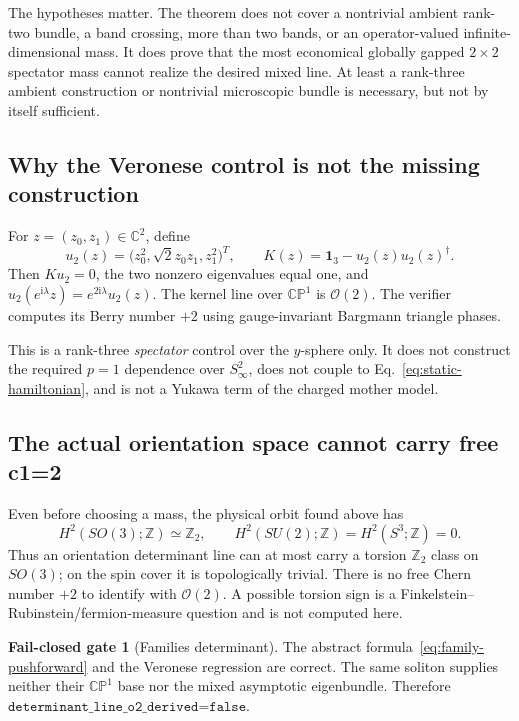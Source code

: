 \documentclass[11pt]{article}
\theoremstyle{definition}
\newtheorem{gate}[theorem]{Fail-closed gate}
\theoremstyle{remark}
\newcommand{\ii}{\mathrm i}
\newcommand{\CC}{\mathbb C}
\newcommand{\ZZ}{\mathbb Z}
\newcommand{\CP}{\mathbb {CP}}
\newcommand{\cO}{\mathcal O}
\begin{document}
The hypotheses matter.  The theorem does not cover a nontrivial ambient
rank-two bundle, a band crossing, more than two bands, or an operator-valued
infinite-dimensional mass.  It does prove that the most economical globally
gapped \(2\times2\) spectator mass cannot realize the desired mixed line.
At least a rank-three ambient construction or nontrivial microscopic bundle
is necessary, but not by itself sufficient.

\subsection{Why the Veronese control is not the missing construction}

For \(z=(z_0,z_1)\in\CC^2\), define
\begin{equation}
 u_2(z)=\bigl(z_0^2,\sqrt2z_0z_1,z_1^2\bigr)^T,
 \qquad
 K(z)=\bm1_3-u_2(z)u_2(z)^\dagger.
 \label{eq:veronese}
\end{equation}
Then \(K u_2=0\), the two nonzero eigenvalues equal one, and
\(u_2(e^{\ii\lambda}z)=e^{2\ii\lambda}u_2(z)\).  The kernel line over
\(\CP^1\) is \(\cO(2)\).  The verifier computes its Berry number \(+2\) using
gauge-invariant Bargmann triangle phases.

This is a rank-three \emph{spectator} control over the \(y\)-sphere only.  It
does not construct the required \(p=1\) dependence over \(S^2_\infty\), does
not couple to Eq.~\eqref{eq:static-hamiltonian}, and is not a Yukawa term of
the charged mother model.

\subsection{The actual orientation space cannot carry free c1=2}

Even before choosing a mass, the physical orbit found above has
\begin{equation}
 H^2(SO(3);\ZZ)\simeq\ZZ_2,
 \qquad H^2(SU(2);\ZZ)=H^2(S^3;\ZZ)=0.
 \label{eq:so3-cohomology}
\end{equation}
Thus an orientation determinant line can at most carry a torsion
\(\ZZ_2\) class on \(SO(3)\); on the spin cover it is topologically trivial.
There is no free Chern number \(+2\) to identify with \(\cO(2)\).  A possible
torsion sign is a Finkelstein--Rubinstein/fermion-measure question and is not
computed here.

\begin{gate}[Families determinant]
The abstract formula~\eqref{eq:family-pushforward} and the Veronese regression
are correct.  The same soliton supplies neither their \(\CP^1\) base nor the
mixed asymptotic eigenbundle.  Therefore
\(\texttt{determinant\_line\_o2\_derived=false}\).
\end{gate}
\end{document}
